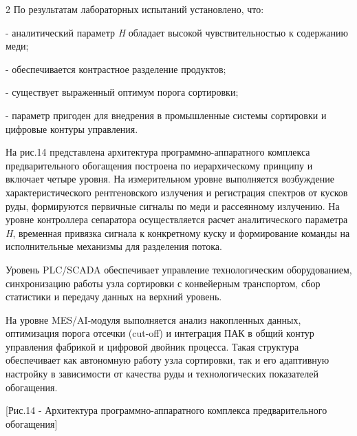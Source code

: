 \begin{multicols}{2}
По результатам лабораторных испытаний установлено, что:

- аналитический параметр \emph{H} обладает высокой чувствительностью к
содержанию меди;

- обеспечивается контрастное разделение продуктов;

- существует выраженный оптимум порога сортировки;

- параметр пригоден для внедрения в промышленные системы сортировки и
цифровые контуры управления.

На рис.14 представлена архитектура программно-аппаратного комплекса
предварительного обогащения построена по иерархическому принципу и
включает четыре уровня. На измерительном уровне выполняется возбуждение
характеристического рентгеновского излучения и регистрация спектров от
кусков руды, формируются первичные сигналы по меди и рассеянному
излучению. На уровне контроллера сепаратора осуществляется расчет
аналитического параметра \emph{H}, временная привязка сигнала к
конкретному куску и формирование команды на исполнительные механизмы для
разделения потока.

Уровень PLC/SCADA обеспечивает управление технологическим оборудованием,
синхронизацию работы узла сортировки с конвейерным транспортом, сбор
статистики и передачу данных на верхний уровень.

На уровне MES/AI-модуля выполняется анализ накопленных данных,
оптимизация порога отсечки (cut-off) и интеграция ПАК в общий контур
управления фабрикой и цифровой двойник процесса. Такая структура
обеспечивает как автономную работу узла сортировки, так и его адаптивную
настройку в зависимости от качества руды и технологических показателей
обогащения.
\end{multicols}

[Рис.14 - Архитектура программно-аппаратного комплекса
предварительного обогащения]

